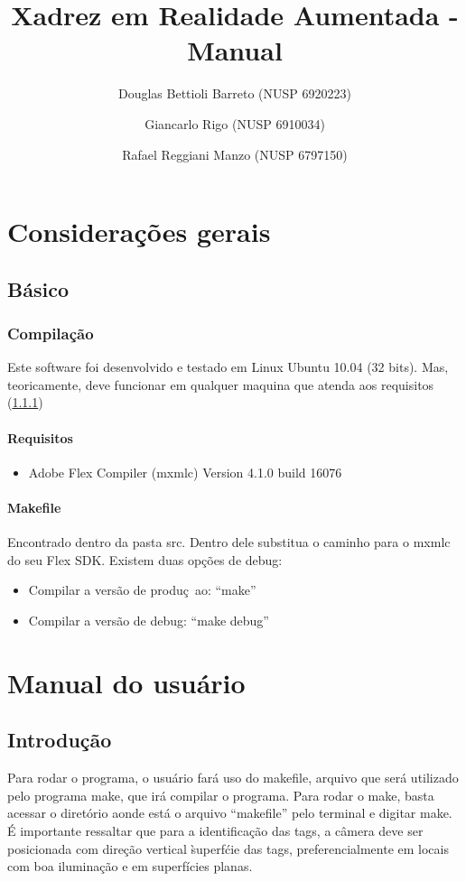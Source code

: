 \documentclass[a4paper,12pt]{book}
\title{Xadrez em Realidade Aumentada - Manual}
\author{
		Douglas Bettioli Barreto (NUSP 6920223)
		\and Giancarlo Rigo (NUSP 6910034)
		\and Rafael Reggiani Manzo (NUSP 6797150)
	   }
\begin{document}
\maketitle

\part{Considera\c c\~oes gerais}
\label{part:consideracoesgerais}
  \chapter{B\'asico}
  \label{chbasico}
  \section{Compila\c c\~ao}
	\label{sec:cgcompilacao}
	Este software foi desenvolvido e testado em Linux Ubuntu 10.04 (32 bits). Mas,
	teoricamente, deve funcionar em qualquer maquina que atenda aos requisitos
	(\ref{subsec:cgrequisitos})
	
	\subsection{Requisitos}
	\label{subsec:cgrequisitos}
	\begin{itemize}
		\item{Adobe Flex Compiler (mxmlc) Version 4.1.0 build 16076}
	\end{itemize}
	
	\subsection{Makefile}
	Encontrado dentro da pasta src. Dentro dele substitua o caminho para o mxmlc do
	seu Flex SDK.
	Existem duas op\c c\~oes de debug:
	\begin{itemize}
	  \item{Compilar a vers\~ao de produ\c c~ao: ``make''}
	  \item{Compilar a vers\~ao de debug: ``make debug''}
	\end{itemize}

\part{Manual do usu\'ario}
\label{part:manualdousuario}
	\chapter{Introdu\c c\~ao}
	Para rodar o programa, o usuário far\'a uso do makefile, arquivo que ser\'a
	utilizado pelo programa make, que ir\'a compilar o programa. Para rodar o make,
	basta acessar o diret\'orio aonde está o arquivo “makefile” pelo terminal e
	digitar make. \'E importante ressaltar que para a identifica\c c\~ao das tags,
	a c\^amera deve ser posicionada com direção vertical \` superf\'cie das tags, preferencialmente em locais com boa iluminação e em superf\'icies planas.
\end{document}
